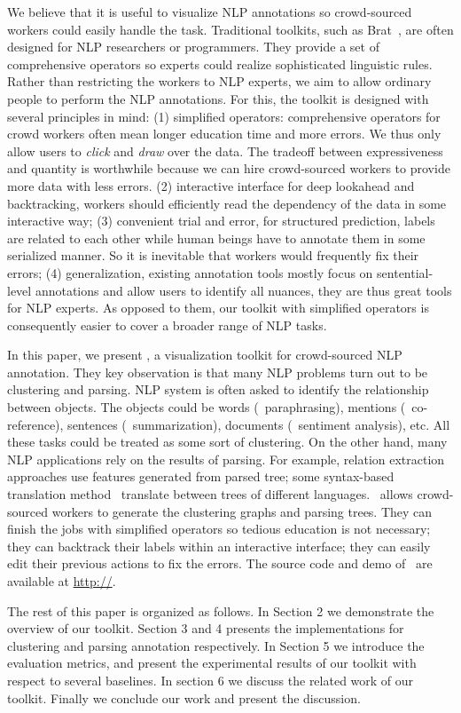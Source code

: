 We believe that it is useful to visualize NLP annotations so crowd-sourced workers could easily handle the task. Traditional toolkits, such as Brat~\cite{brat2014}, are often designed for NLP researchers or programmers. They provide a set of comprehensive operators so experts could realize sophisticated linguistic rules. Rather than restricting the workers to NLP experts, we aim to allow ordinary people to perform the NLP annotations. For this, the toolkit is designed with several principles in mind: (1) simplified operators: comprehensive operators for crowd workers often mean longer education time and more errors. We thus only allow users to {\em click} and {\em draw} over the data. The tradeoff between expressiveness and quantity is worthwhile because we can hire crowd-sourced workers to provide more data with less errors. (2) interactive interface for deep lookahead and backtracking, workers should efficiently read the dependency of the data in some interactive way; (3) convenient trial and error, for structured prediction, labels are related to each other while human beings have to annotate them in some serialized manner. So it is inevitable that workers would frequently fix their errors; (4) generalization, existing annotation tools mostly focus on sentential-level annotations and allow users to identify all nuances, they are thus great tools for NLP experts. As opposed to them, our toolkit with simplified operators is consequently easier to cover a broader range of NLP tasks.

In this paper, we present \sys, a visualization toolkit for crowd-sourced NLP annotation. They key observation is that many NLP problems turn out to be clustering and parsing. NLP system is often asked to identify the relationship between objects. The objects could be words (\eg\ paraphrasing), mentions (\eg\ co-reference), sentences (\eg\ summarization), documents (\eg\ sentiment analysis), etc. All these tasks could be treated as some sort of clustering. On the other hand, many NLP applications rely on the results of parsing. For example, relation extraction~\cite{hoffmann2011knowledge} approaches use features generated from parsed tree; some syntax-based translation method~\cite{chiang2010learning} translate between trees of different languages. \sys\ allows crowd-sourced workers to generate the clustering graphs and parsing trees. They can finish the jobs with simplified operators so tedious education is not necessary; they can backtrack their labels within an interactive interface; they can easily edit their previous actions to fix the errors. The source code and demo of \sys\ are available at \url{http://}.

The rest of this paper is organized as follows. In Section 2 we demonstrate the overview of our toolkit. Section 3 and 4 presents the implementations for clustering and parsing annotation respectively. In Section 5 we introduce the evaluation metrics, and present the experimental results of our toolkit with respect to several baselines. In section 6 we discuss the related work of our toolkit. Finally we conclude our work and present the discussion. 





 


